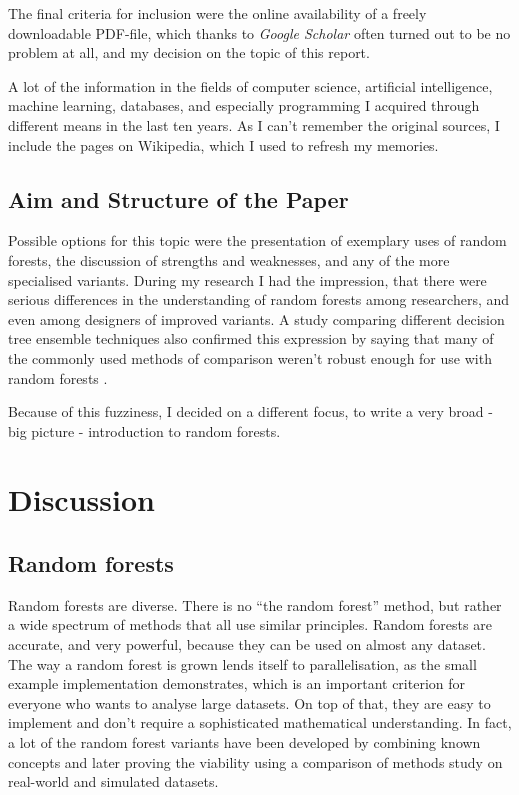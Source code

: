 \documentclass[a4paper,man,12pt,apacite,floatsintext,draftfirst]{apa6} %
\begin{document}
The final criteria for inclusion were the online availability of a freely
downloadable PDF-file, which thanks to \emph{Google Scholar} often turned
out to be no problem at all, and my decision on the topic of
this report.

A lot of the information in the fields of computer science, artificial
intelligence, machine learning, databases, and especially programming
I acquired through different means in the last ten years.
As I can't remember the original sources, I include the pages
on Wikipedia, which I used to refresh my memories.

\subsection{Aim and Structure of the Paper}
Possible options for this topic were the presentation of
exemplary uses of random
forests, the discussion of strengths and weaknesses, and any of the more
specialised variants.
During my research I had the impression, that there were serious
differences in the understanding of random forests among researchers,
and even among designers of improved variants.
A study comparing different decision tree ensemble techniques also confirmed
this expression by saying that many of the commonly used methods of comparison
weren't robust enough for use with random forests \cite{banfield2007comparison}.

Because of this fuzziness, I decided on a different focus, to write
a very broad - big picture - introduction to random forests.

\newpage
\section{Discussion}
\subsection{Random forests}
Random forests are diverse.
There is no “the random forest” method, but rather a wide spectrum of
methods that all use similar principles.
Random forests are accurate, and very powerful, because they can be used
on almost any dataset.
The way a random forest is grown lends itself to parallelisation, as the
small example implementation demonstrates, which is an important criterion
for everyone who wants to analyse large datasets.
On top of that, they are easy to implement and don't require a sophisticated
mathematical understanding.
In fact, a lot of the random forest variants have been developed by combining
known concepts and later proving the viability using  a comparison of methods
study on real-world and simulated datasets.
\end{document}
